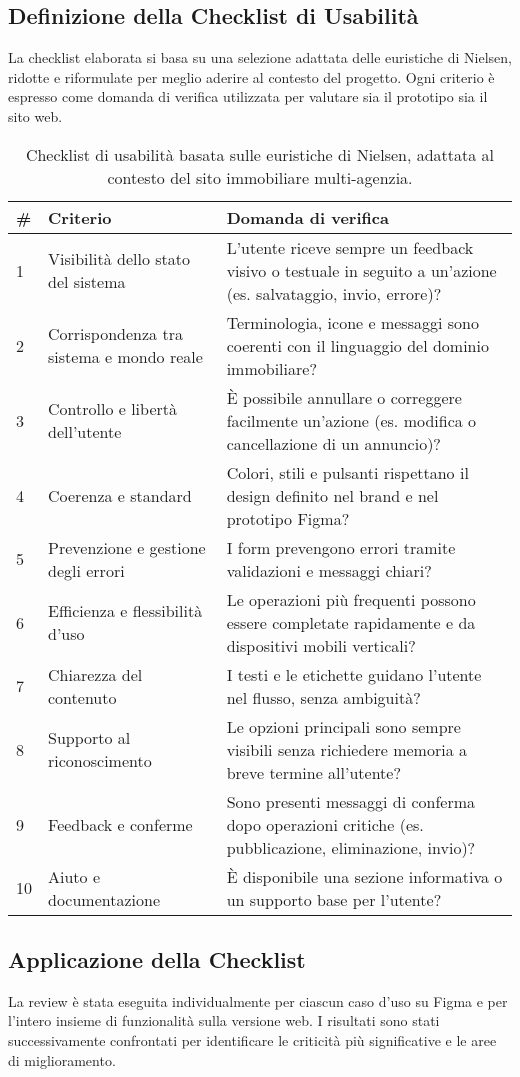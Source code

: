 \subsection*{Definizione della Checklist di Usabilità}

La checklist elaborata si basa su una selezione adattata delle euristiche di Nielsen, ridotte e riformulate per meglio aderire al contesto del progetto.  
Ogni criterio è espresso come domanda di verifica utilizzata per valutare sia il prototipo sia il sito web.

\begin{table}[h!]
\centering
\begin{tabular}{p{0.8cm} p{4cm} p{7cm}}
\hline
\textbf{\#} & \textbf{Criterio} & \textbf{Domanda di verifica} \\
\hline
1 & Visibilità dello stato del sistema & L’utente riceve sempre un feedback visivo o testuale in seguito a un’azione (es. salvataggio, invio, errore)? \\
2 & Corrispondenza tra sistema e mondo reale & Terminologia, icone e messaggi sono coerenti con il linguaggio del dominio immobiliare? \\
3 & Controllo e libertà dell’utente & È possibile annullare o correggere facilmente un’azione (es. modifica o cancellazione di un annuncio)? \\
4 & Coerenza e standard & Colori, stili e pulsanti rispettano il design definito nel brand e nel prototipo Figma? \\
5 & Prevenzione e gestione degli errori & I form prevengono errori tramite validazioni e messaggi chiari? \\
6 & Efficienza e flessibilità d’uso & Le operazioni più frequenti possono essere completate rapidamente e da dispositivi mobili verticali? \\
7 & Chiarezza del contenuto & I testi e le etichette guidano l’utente nel flusso, senza ambiguità? \\
8 & Supporto al riconoscimento & Le opzioni principali sono sempre visibili senza richiedere memoria a breve termine all’utente? \\
9 & Feedback e conferme & Sono presenti messaggi di conferma dopo operazioni critiche (es. pubblicazione, eliminazione, invio)? \\
10 & Aiuto e documentazione & È disponibile una sezione informativa o un supporto base per l’utente? \\
\hline
\end{tabular}
\caption{Checklist di usabilità basata sulle euristiche di Nielsen, adattata al contesto del sito immobiliare multi-agenzia.}
\label{tab:checklist_usabilita}
\end{table}

\subsection*{Applicazione della Checklist}

La review è stata eseguita individualmente per ciascun caso d’uso su Figma e per l’intero insieme di funzionalità sulla versione web.  
I risultati sono stati successivamente confrontati per identificare le criticità più significative e le aree di miglioramento.


